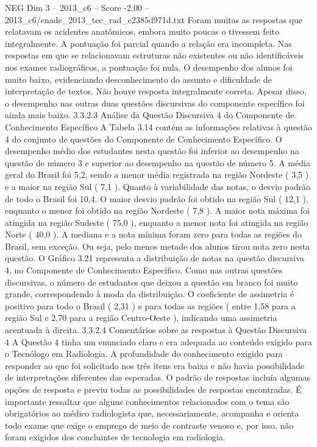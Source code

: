 \begin{textsample}{NEG Dim 3 – 2013\_c6 – Score -2.00 – 2013\_c6/enade\_2013\_tec\_rad\_c2385d971d.txt}
Foram muitas as respostas que relatavam os acidentes anatômicos, embora muito poucas o tivessem feito integralmente.
A pontuação foi parcial quando a relação era incompleta.
Nas respostas em que se relacionavam estruturas não existentes ou não identificáveis nos exames radiográficos, a pontuação foi nula.
O desempenho dos alunos foi muito baixo, evidenciando desconhecimento do assunto e dificuldade de interpretação de textos.
Não houve resposta integralmente correta.
Apesar disso, o desempenho nas outras duas questões discursivas do componente específico foi ainda mais baixo. 3.3.2.3 Análise da Questão Discursiva 4 do Componente de Conhecimento Específico A Tabela 3.14 contém as informações relativas à questão 4 do conjunto de questões do Componente de Conhecimento Específico.
O desempenho médio dos estudantes nesta questão foi inferior ao desempenho na questão de número 3 e superior ao desempenho na questão de número 5.
A média geral do Brasil foi 5,2, sendo a menor média registrada na região Nordeste ( 3,5 ) e a maior na região Sul ( 7,1 ).
Quanto à variabilidade das notas, o desvio padrão de todo o Brasil foi 10,4.
O maior desvio padrão foi obtido na região Sul ( 12,1 ), enquanto o menor foi obtido na região Nordeste ( 7,8 ).
A maior nota máxima foi atingida na região Sudeste ( 75,0 ), enquanto a menor nota foi atingida na região Norte ( 40,0 ).
A mediana e a nota mínima foram zero para todas as regiões do Brasil, sem exceção.
Ou seja, pelo menos metade dos alunos tirou nota zero nesta questão.
O Gráfico 3.21 representa a distribuição de notas na questão discursiva 4, no Componente de Conhecimento Específico.
Como nas outras questões discursivas, o número de estudantes que deixou a questão em branco foi muito grande, correspondendo à moda da distribuição.
O coeficiente de assimetria é positivo para todo o Brasil ( 2,31 ) e para todas as regiões ( entre 1,58 para a região Sul e 2,70 para a região Centro-Oeste ), indicando uma assimetria acentuada à direita. 3.3.2.4 Comentários sobre as respostas à Questão Discursiva 4 A Questão 4 tinha um enunciado claro e era adequada ao conteúdo exigido para o Tecnólogo em Radiologia.
A profundidade do conhecimento exigido para responder ao que foi solicitado nos três itens era baixa e não havia possibilidade de interpretações diferentes das esperadas.
O padrão de respostas incluía algumas opções de resposta e previu todas as possibilidades de respostas encontradas.
É importante ressaltar que alguns conhecimentos relacionados com o tema são obrigatórios ao médico radiologista que, necessariamente, acompanha e orienta todo exame que exige o emprego de meio de contraste venoso e, por isso, não foram exigidos dos concluintes de tecnologia em radiologia.

\end{textsample}
